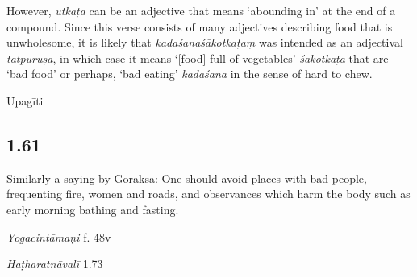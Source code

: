 \begin{ekdosis}
\begin{philcomm}[hp01_060]
However, \emph{utkaṭa} can be an adjective that means ‘abounding in’ at the end of a compound. Since this verse consists of many adjectives describing food that is unwholesome, it is likely that \emph{kadaśanaśākotkaṭaṃ} was intended as an adjectival \emph{tatpuruṣa}, in which case it means ‘[food] full of vegetables' \emph{śākotkaṭa} that are `bad food' or perhaps, `bad eating' \emph{kadaśana} in the sense of hard to chew. 
\end{philcomm}

\begin{metre}[hp01_060]
Upagīti 
\end{metre}

\subsection*{1.61}
\begin{translation}[hp01_061]
Similarly a saying by Goraksa:
One should avoid places with bad people, frequenting fire, women and roads, and observances which harm the body such as early morning bathing and fasting.%
\end{translation}




\begin{testimonia}[hp01_061]
\emph{Yogacintāmaṇi} f. 48v

\begin{versinnote}
\end{versinnote}

\emph{Haṭharatnāvalī} 1.73 

\begin{versinnote}
\tl{\var{°prīti°] °prāntaṃ P, prāptaṃ T,t1. kāyakleśādikaṃ ] kāyakleśavidhiṃ P,T.}\\!}
\end{versinnote}


\end{testimonia}
\end{ekdosis}
